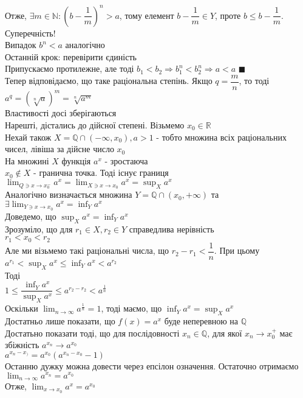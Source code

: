 \documentclass[a4paper, 14pt]{extarticle}
\def\huge{\displaystyle}
\def\bigline{\vspace{5mm}\\}
\def\bigline{\vspace{5mm}\\}
\def\qed{$\blacksquare$}
\begin{document}
Отже, $\exists m \in \mathbb{N}: \left(b - \dfrac{1}{m} \right)^n > a$, тому елемент $b - \dfrac{1}{m} \in Y$, проте $b \leq b - \dfrac{1}{m}$. Суперечність!\\
Випадок $b^n < a$ аналогічно
\bigline
Останній крок: перевірити єдиність\\
Припускаємо протилежне, але тоді $b_1 < b_2 \Rightarrow b_1^n < b_2^n \Rightarrow a < a$ \qed
\bigline
Тепер відповідаємо, що таке раціональна степінь. Якщо $q = \dfrac{m}{n}$, то тоді\\
$a^q = \left(\sqrt[n]{a} \right)^m = \sqrt[n]{a^m}$\\
Властивості досі зберігаються
\bigline
Нарешті, дістались до дійсної степені. Візьмемо $x_0 \in \mathbb{R}$\\
Нехай також $X = \mathbb{Q} \cap (-\infty, x_0), a > 1$ - тобто множина всіх раціональних чисел, лівіша за дійсне число $x_0$\\
На множині $X$ функція $a^x$ - зростаюча\\
$x_0 \not\in X$ - гранична точка. Тоді існує границя\\
$\huge \lim_{Q \ni x \to x_0^-} a^x = \lim_{X \ni x \to x_0} a^x = \sup_{X} a^x$\\
Аналогічно визначається множина $Y = \mathbb{Q} \cap (x_0,+\infty)$ та $\exists \huge\lim_{Y \ni x \to x_0} a^x = \inf_{Y} a^x$\\
Доведемо, що $\sup_X a^x = \inf_Y a^x$\\
Зрозуміло, що для $r_1 \in X, r_2 \in Y$ справедлива нерівність\\
$r_1 < x_0 < r_2$\\
Але ми візьмемо такі раціональні числа, що $r_2 - r_1 < \dfrac{1}{n}$. При цьому\\
$a^{r_1} < \sup_X a^x \leq \inf_Y a^x < a^{r_2}$\\
Тоді\\
$1 \leq \dfrac{\huge \inf_Y a^x}{\huge \sup_X a^x} \leq a^{r_2-r_2} < a^{\frac{1}{n}}$\\
Оскільки $\huge \lim_{n \to \infty} a^{\frac{1}{n}} = 1$, тоді маємо, що $\huge \inf_Y a^x = \sup_X a^x$\\
Достатньо лише показати, що $f(x) = a^x$ буде неперевною на $\mathbb{Q}$\\
Достатьно показати тоді, що для послідовності $x_n \in \mathbb{Q}$, для якої $x_n \to x_0^+$ має збіжність $a^{x_n} \to a^{x_0}$\\
$a^{x_n-x_)} = a^{x_0}(a^{x_n-x_0}-1)$\\
Останню дужку можна довести через епсілон означення. Остаточно отримаємо\\
$\huge\lim_{n \to \infty} a^{x_n} = a^{x_0}$
\bigline
Отже, $\huge \lim_{x \to x_0} a^x = a^{x_0}$
\newpage
    	
\end{document}

